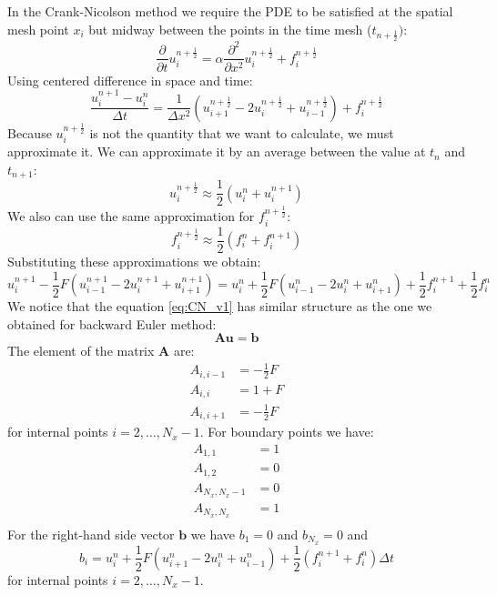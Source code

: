 \documentclass[a4paper,12pt]{article}
\begin{document}
In the Crank-Nicolson method we require the PDE to be satisfied at the spatial
mesh point $x_{i}$ but midway between the points in the time mesh ($t_{n+\frac{1}{2}})$:
\begin{equation}
\frac{\partial}{\partial t} u_{i}^{n+\frac{1}{2}} =
\alpha\frac{\partial^2}{\partial x^2} u_{i}^{n+\frac{1}{2}} + 
f_{i}^{n+\frac{1}{2}}
\end{equation}
%
Using centered difference in space and time:
%
\begin{equation}
\frac{u_{i}^{n+1} - u_{i}^{n}}{\Delta t} = 
\frac{1}{\Delta x^2} \left(
u_{i+1}^{n+\frac{1}{2}} - 2u_{i}^{n+\frac{1}{2}} + u_{i-1}^{n+\frac{1}{2}}
\right) + f_{i}^{n+\frac{1}{2}}
\end{equation}
%
Because $u_{i}^{n+\frac{1}{2}}$ is not the quantity that we want to calculate,
we must approximate it.
We can approximate it by an average between the value at $t_n$ and $t_{n+1}$:
\begin{equation}
u_{i}^{n+\frac{1}{2}} \approx \frac{1}{2}( u_{i}^{n} + u_{i}^{n+1} )
\end{equation}
We also can use the same approximation for $f_{i}^{n+\frac{1}{2}}$:
\begin{equation}
f_{i}^{n+\frac{1}{2}} \approx \frac{1}{2}( f_{i}^{n} + f_{i}^{n+1} )
\end{equation}
%
Substituting these approximations we obtain:
%
\begin{equation}
u_{i}^{n+1} - \frac{1}{2} F \left( u_{i-1}^{n+1} - 2u^{n+1}_{i} + u^{n+1}_{i+1} \right) =
u_{i}^{n} + \frac{1}{2} F \left( u_{i-1}^{n} - 2u^{n}_{i} + u^{n}_{i+1} \right) +
\frac{1}{2} f_{i}^{n+1} + \frac{1}{2} f_{i}^{n}
\label{eq:CN_v1}
\end{equation}
%
We notice that the equation \eqref{eq:CN_v1} has similar structure as the one we obtained
for backward Euler method:
%
\begin{equation}
\mathbf{A}\mathbf{u} = \mathbf{b}
\end{equation}
%
The element of the matrix $\mathbf{A}$ are:
%
\begin{align*}
A_{i,i-1} & = -\frac{1}{2}F \\
A_{i,i}   & = 1 + F \\
A_{i,i+1} & = -\frac{1}{2}F
\end{align*}
%
for internal points $i = 2,\ldots,N_{x}-1$. For boundary points we have:
%
\begin{align*}
A_{1,1} & = 1 \\
A_{1,2} & = 0 \\
A_{N_{x},N_{x}-1} & = 0 \\
A_{N_{x},N_{x}} & = 1 \\
\end{align*}
%
For the right-hand side vector $\mathbf{b}$ we have $b_{1} = 0$ and $b_{N_x} = 0$ and
\begin{equation}
b_{i} = u^{n}_{i} + \frac{1}{2}F \left( u^{n}_{i+1} -2u^{n}_{i} + u^{n}_{i-1} \right) +
\frac{1}{2} \left( f_{i}^{n+1} + f_{i}^{n} \right) \Delta t
\end{equation}
for internal points $i = 2, \ldots, N_{x}-1$.









\end{document}
